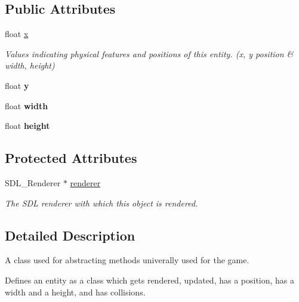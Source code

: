 \subsection*{Public Attributes}
\begin{DoxyCompactItemize}
\item 
\mbox{\label{classEntity_abc2d19ee6ff26b8520428894da6a8f68}} 
float \hyperlink{classEntity_abc2d19ee6ff26b8520428894da6a8f68}{x}
\begin{DoxyCompactList}\small\item\em Values indicating physical features and positions of this entity. (x, y position \& width, height) \end{DoxyCompactList}\item 
\mbox{\label{classEntity_af4966f81d91cc8f8d5eb9e9002240c49}} 
float {\bfseries y}
\item 
\mbox{\label{classEntity_adadfcc784f30b51b8e49f8230a56b793}} 
float {\bfseries width}
\item 
\mbox{\label{classEntity_a4550dc1011f47f6c4bb86e564e7d605b}} 
float {\bfseries height}
\end{DoxyCompactItemize}
\subsection*{Protected Attributes}
\begin{DoxyCompactItemize}
\item 
\mbox{\label{classEntity_a2747dfdd9fa4fe743c8b80450bc99dbd}} 
S\+D\+L\+\_\+\+Renderer $\ast$ \hyperlink{classEntity_a2747dfdd9fa4fe743c8b80450bc99dbd}{renderer}
\begin{DoxyCompactList}\small\item\em The S\+DL renderer with which this object is rendered. \end{DoxyCompactList}\end{DoxyCompactItemize}


\subsection{Detailed Description}
A class used for abstracting methods univerally used for the game. 

Defines an entity as a class which gets rendered, updated, has a position, has a width and a height, and has collisions. 

